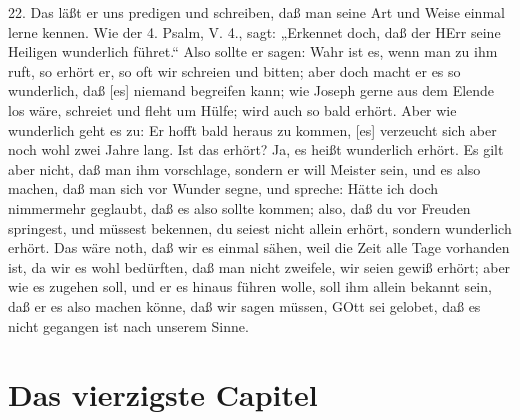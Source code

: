22. Das läßt er uns predigen und schreiben, daß man seine Art und Weise einmal lerne kennen. Wie der 4. Psalm, V. 4., sagt: „Erkennet doch, daß der HErr seine Heiligen wunderlich führet.“ Also sollte er sagen: Wahr ist es, wenn man zu ihm ruft, so erhört er, so oft wir schreien und bitten; aber doch macht er es so wunderlich, daß [es] niemand begreifen kann; wie Joseph gerne aus dem Elende los wäre, schreiet und fleht um Hülfe; wird auch so bald erhört. Aber wie wunderlich geht es zu: Er hofft bald heraus zu kommen, [es] verzeucht sich aber noch wohl zwei Jahre lang. Ist das erhört? Ja, es heißt wunderlich erhört. Es gilt aber nicht, daß man ihm vorschlage, sondern er will Meister sein, und es also machen, daß man sich vor Wunder segne, und spreche: Hätte ich doch nimmermehr geglaubt, daß es also sollte kommen; also, daß du vor Freuden springest, und müssest bekennen, du seiest nicht allein erhört, sondern wunderlich erhört. Das wäre noth, daß wir es einmal sähen, weil die Zeit alle Tage vorhanden ist, da wir es wohl bedürften, daß man nicht zweifele, wir seien gewiß erhört; aber wie es zugehen soll, und er es hinaus führen wolle, soll ihm allein bekannt sein, daß er es also machen könne, daß wir sagen müssen, GOtt sei gelobet, daß es nicht gegangen ist nach unserem Sinne.

\section{Das vierzigste Capitel}

